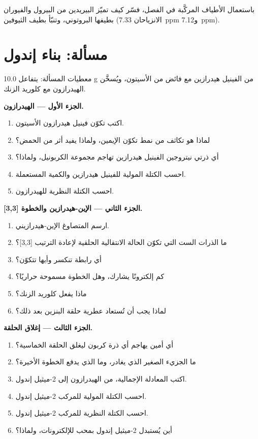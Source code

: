 \begin{exercise}[$\star\star\star$]\label{exo:b3:heterocycles:12}
باستعمال الأطياف المركَّبة في الفصل، فسّر كيف تميّز البيريدين من
البيرول والفيوران بطيفها البروتوني، وتنبّأ بطيف
الثيوفين (الانزياحان \qty{7.33}{ppm} و\qty{7.12}{ppm}).
\end{exercise}

\section{مسألة: بناء إندول}

\begin{problem}
\label{pb:b3:heterocycles:1}
معطيات المسألة: يتفاعل 10.0 g من الفينيل هيدرازين مع فائض من الأسيتون، 
ويُسخَّن الهيدرازون مع كلوريد الزنك.

\medskip\noindent\textbf{الجزء الأول --- الهيدرازون.}
\begin{enumerate}
  \item اكتب تكوّن فينيل هيدرازون الأسيتون.
  \item لماذا هو تكاثف من نمط تكوّن الإيمين، ولماذا يفيد أثر من الحمض؟
  \item أي ذرتي نيتروجين الفينيل هيدرازين تهاجم مجموعة الكربونيل، ولماذا؟
  \item احسب الكتلة المولية للفينيل هيدرازين والكمية المستعملة.
  \item احسب الكتلة النظرية للهيدرازون.
\end{enumerate}

\medskip\noindent\textbf{الجزء الثاني --- الإين-هيدرازين والخطوة [3,3].}
\begin{enumerate}[resume]
  \item ارسم المتصاوغ الإين-هيدرازيني.
  \item ما الذرات الست التي تكوّن الحالة الانتقالية الحلقية لإعادة الترتيب [3,3]؟
  \item أي رابطة تنكسر وأيها تتكوّن؟
  \item كم إلكترونًا يشارك، وهل الخطوة مسموحة حراريًا؟
  \item ماذا يفعل كلوريد الزنك؟
  \item لماذا يجب أن تُستعاد عطرية حلقة البنزين بعد ذلك؟
\end{enumerate}

\medskip\noindent\textbf{الجزء الثالث --- إغلاق الحلقة.}
\begin{enumerate}[resume]
  \item أي أمين يهاجم أي ذرة كربون ليغلق الحلقة الخماسية؟
  \item ما الجزيء الصغير الذي يغادر، وما الذي يدفع الخطوة الأخيرة؟
  \item اكتب المعادلة الإجمالية، من الهيدرازون إلى 2-ميثيل إندول.
  \item احسب الكتلة المولية للمركب 2-ميثيل إندول.
  \item احسب الكتلة النظرية للمركب 2-ميثيل إندول.
  \item أين يُستبدل 2-ميثيل إندول بمحب للإلكترونات، ولماذا؟
\end{enumerate}


\end{problem}
